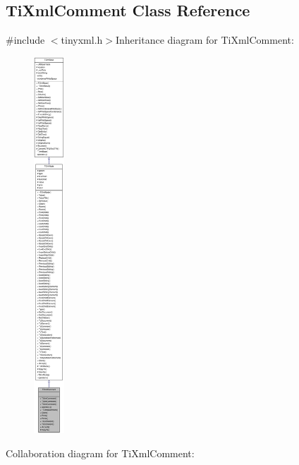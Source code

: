 \hypertarget{class_ti_xml_comment}{
\subsection{TiXmlComment Class Reference}
\label{class_ti_xml_comment}
}


{\ttfamily \#include $<$tinyxml.h$>$}Inheritance diagram for TiXmlComment:\nopagebreak
\begin{figure}[H]
\begin{center}
\leavevmode
\includegraphics[height=400pt]{class_ti_xml_comment__inherit__graph}
\end{center}
\end{figure}
Collaboration diagram for TiXmlComment:\nopagebreak
